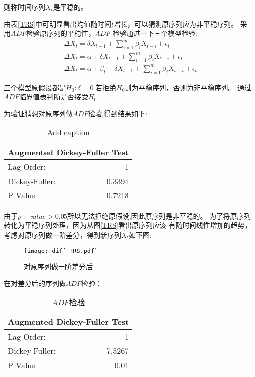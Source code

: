 \documentclass[12pt,a4paper]{nmmcm}
\begin{document}
  则称时间序列\(X_t\)是平稳的。

由表\ref{TRS}中可明显看出均值随时间\(t\)增长，可以猜测原序列应为非平稳序列。
采用\(ADF\)检验原序列的平稳性，\(ADF\) 检验通过一下三个模型检验:
\begin{equation}
  \begin{aligned}
  &\Delta X_t = \delta X_{t-1} + \sum_{i=1}^{m}\beta_i X_{t-i} + \epsilon_t \\
  &\Delta X_t =\alpha + \delta X_{t-1} + \sum_{i=1}^{m}\beta_i X_{t-i} + \epsilon_t \\
  &\Delta X_t =\alpha +\beta_t+ \delta X_{t-1} + \sum_{i=1}^{m}\beta_i X_{t-i} + \epsilon_t
  \end{aligned}
\end{equation}

三个模型原假设都是\(H_0 : \delta = 0\) 若拒绝\(H_0\)则为平稳序列，否则为非平稳序列。
通过\(ADF \)临界值表判断是否接受\(H_0\)

为验证猜想对原序列做\(ADF\)检验,得到结果如下:
\begin{table}[htb]
  \centering
  \caption{Add caption}
    \begin{tabular}{lr}
    \multicolumn{2}{c}{ Augmented Dickey-Fuller Test} \\
    \hline
    Lag Order: & 1 \\
    Dickey-Fuller: & 0.3394\\
    P Value  & 0.7218 \\
    \end{tabular}%
  \label{tab:ADF_raw}%
\end{table}%

由于\(p-value > 0.05 \)所以无法拒绝原假设,因此原序列是非平稳的。
为了将原序列转化为平稳序列处理，因为从图\ref{TRS}看出原序列应该
有随时间线性增加的趋势，考虑对原序列做一阶差分\cite{Rob}，得到新序列\(\hat{X}_t\)如下图:
\begin{figure}[H] %
  \centering %
  \texttt{[image: diff\_TRS.pdf]} %
  \caption{对原序列做一阶差分后} %
  \label{diff_TRS} %
\end{figure} 

在对差分后的序列做\(ADF\)检验：
\begin{table}[H]
  \centering
  \caption{\(ADF\)检验}
    \begin{tabular}{lr}
    \multicolumn{2}{c}{ Augmented Dickey-Fuller Test} \\
    \hline
    Lag Order: & 1 \\
    Dickey-Fuller: & -7.5267\\
    P Value  & 0.01 \\
    \end{tabular}%
  \label{tab:ADF_diff}%
\end{table}%
\end{document}
